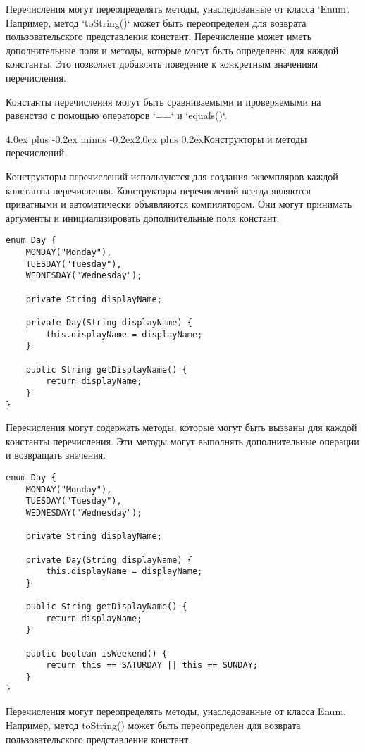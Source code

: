 \documentclass[12pt, a4paper]{book}%
\makeatletter
\renewcommand{\section}{\@startsection{section}{1}{1pt}%
{4.0ex plus -0.2ex minus -0.2ex}{2.0ex plus 0.2ex}{\centering\bf}}%
\makeatother
\begin{document}
{Перечисления могут переопределять методы, унаследованные от класса `Enum`. Например, метод `toString()` может быть переопределен для возврата пользовательского представления констант. Перечисление может иметь дополнительные поля и методы, которые могут быть определены для каждой константы. Это позволяет добавлять поведение к конкретным значениям перечисления.

Константы перечисления могут быть сравниваемыми и проверяемыми на равенство с помощью операторов `==` и `equals()`.

\section{Конструкторы и методы перечислений}

Конструкторы перечислений используются для создания экземпляров каждой константы перечисления. Конструкторы перечислений всегда являются приватными и автоматически объявляются компилятором. Они могут принимать аргументы и инициализировать дополнительные поля констант.
 \begin{lstlisting}
enum Day {
    MONDAY("Monday"),
    TUESDAY("Tuesday"),
    WEDNESDAY("Wednesday");

    private String displayName;

    private Day(String displayName) {
        this.displayName = displayName;
    }

    public String getDisplayName() {
        return displayName;
    }
}
\end{lstlisting}

Перечисления могут содержать методы, которые могут быть вызваны для каждой константы перечисления. Эти методы могут выполнять дополнительные операции и возвращать значения.

 \begin{lstlisting}
enum Day {
    MONDAY("Monday"),
    TUESDAY("Tuesday"),
    WEDNESDAY("Wednesday");

    private String displayName;

    private Day(String displayName) {
        this.displayName = displayName;
    }

    public String getDisplayName() {
        return displayName;
    }

    public boolean isWeekend() {
        return this == SATURDAY || this == SUNDAY;
    }
}
\end{lstlisting}

Перечисления могут переопределять методы, унаследованные от класса Enum. Например, метод toString() может быть переопределен для возврата пользовательского представления констант.

}
\end{document}
